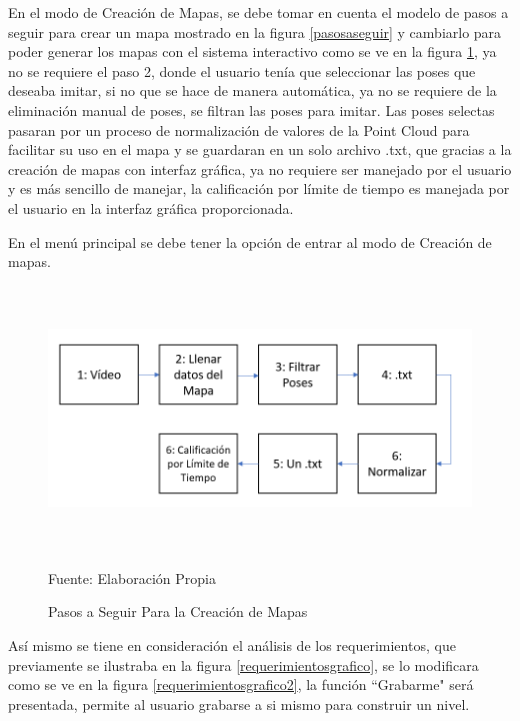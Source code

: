 En el modo de Creación de Mapas, se debe tomar en cuenta el modelo de pasos a seguir para crear un mapa mostrado en la figura \ref{pasosaseguir} y cambiarlo para poder generar los mapas con el sistema interactivo como se ve en la figura \ref{pasosaseguirpart2}, ya no se requiere el paso 2, donde el usuario tenía que seleccionar las poses que deseaba imitar, si no que se hace de manera automática, ya no se requiere de la eliminación manual de poses, se filtran las poses para imitar. Las poses selectas pasaran por un proceso de normalización de valores de la Point Cloud para facilitar su uso en el mapa y se guardaran en un solo archivo .txt, que gracias a la creación de mapas con interfaz gráfica, ya no requiere ser manejado por el usuario y es más sencillo de manejar, la calificación por límite de tiempo es manejada por el usuario en la interfaz gráfica proporcionada.

En el menú principal se debe tener la opción de entrar al modo de Creación de mapas.
\begin{figure}[t!]
	\centering
	\includegraphics[width=16cm,height=7cm,]{./Images/pasosaseguirpart2.png}
	\caption{Pasos a Seguir Para la Creación de Mapas}
	\footnotesize Fuente: Elaboración Propia
	\label{pasosaseguirpart2}
\end{figure}

Así mismo se tiene en consideración el análisis de los requerimientos, que previamente se ilustraba en la figura \ref{requerimientosgrafico}, se lo modificara como se ve en la figura \ref{requerimientosgrafico2}, la función ``Grabarme" será presentada, permite al usuario grabarse a si mismo para construir un nivel.

